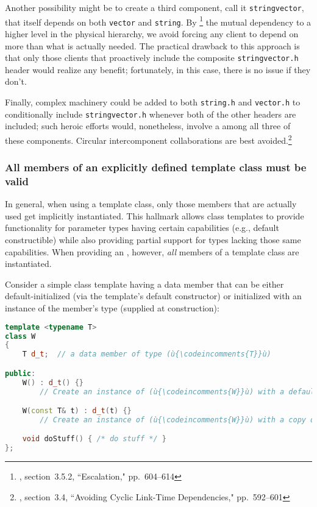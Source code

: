 Another possibility might be to create a third component, call it
\lstinline!stringvector!, that itself depends on both \lstinline!vector!
and \lstinline!string!. By
\footnote{\cite{lakos20}, section~3.5.2, ``Escalation," pp.~604--614} the mutual dependency
to a higher level in the physical hierarchy, we avoid forcing any client
to depend on more than what is actually needed. The practical drawback
to this approach is that only those clients that proactively include the
composite \lstinline!stringvector.h! header would realize any benefit;
fortunately, in this case, there is no  issue if they don't.

Finally, complex machinery could be added to both \lstinline!string.h! and
\lstinline!vector.h! to conditionally include \lstinline!stringvector.h!
whenever both of the other headers are included; such heroic efforts
would, nonetheless, involve a  among
all three of these components. Circular intercomponent collaborations
are best avoided.\footnote{\cite{lakos20}, section~3.4, ``Avoiding Cyclic Link-Time Dependencies," pp.~592--601}

\subsubsection[All members of an explicitly defined template class must be valid]{All members of an explicitly defined template class must be valid}\label{all-members-of-an-explicitly-defined-template-class-must-be-valid}

In general, when using a template class, only those members that are
actually used get implicitly instantiated. This hallmark allows class
templates to provide functionality for parameter types having certain
capabilities (e.g., default constructible) while also providing partial
support for types lacking those same capabilities. When providing an
, however, \emph{all}
members of a template class are instantiated.

Consider a simple class template having a data member that can be either
default-initialized (via the template's default constructor) or
initialized with an instance of the member's type (supplied at
construction):

\begin{lstlisting}[language=C++]
template <typename T>
class W
{
    T d_t;  // a data member of type (ù{\codeincomments{T}}ù)

public:
    W() : d_t() {}
        // Create an instance of (ù{\codeincomments{W}}ù) with a default-constructed (ù{\codeincomments{T}}ù) member.

    W(const T& t) : d_t(t) {}
        // Create an instance of (ù{\codeincomments{W}}ù) with a copy of the specified (ù{\codeincomments{t}}ù).

    void doStuff() { /* do stuff */ }
};
\end{lstlisting}
    

